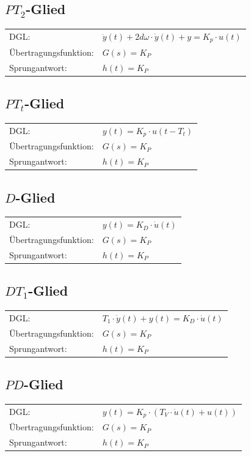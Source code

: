 \subsection{$PT_2$-Glied}
\begin{tabular}{ll}
\rule[-2ex]{0pt}{5.5ex} DGL: & $\ddot{y}(t) + 2d\omega\cdot \dot{y}(t)+y=K_p \cdot u(t)$ \\ 
\rule[-2ex]{0pt}{5.5ex} Übertragungsfunktion: & $G(s) = K_P$ \\ 
\rule[-2ex]{0pt}{5.5ex} Sprungantwort: & $h(t) = K_P$ \\ 
\end{tabular} 
\subsection{$PT_t$-Glied}
\begin{tabular}{ll}
\rule[-2ex]{0pt}{5.5ex} DGL: & $y(t) = K_p \cdot u(t-T_t)$ \\ 
\rule[-2ex]{0pt}{5.5ex} Übertragungsfunktion: & $G(s) = K_P$ \\ 
\rule[-2ex]{0pt}{5.5ex} Sprungantwort: & $h(t) = K_P$ \\ 
\end{tabular} 
\subsection{$D$-Glied}
\begin{tabular}{ll}
\rule[-2ex]{0pt}{5.5ex} DGL: & $y(t) = K_D \cdot \dot{u}(t)$ \\ 
\rule[-2ex]{0pt}{5.5ex} Übertragungsfunktion: & $G(s) = K_P$ \\ 
\rule[-2ex]{0pt}{5.5ex} Sprungantwort: & $h(t) = K_P$ \\ 
\end{tabular} 
\subsection{$DT_1$-Glied}
\begin{tabular}{ll}
\rule[-2ex]{0pt}{5.5ex} DGL: & $T_1 \cdot \dot{y}(t) + y(t) = K_D \cdot \dot{u}(t)$ \\ 
\rule[-2ex]{0pt}{5.5ex} Übertragungsfunktion: & $G(s) = K_P$ \\ 
\rule[-2ex]{0pt}{5.5ex} Sprungantwort: & $h(t) = K_P$ \\ 
\end{tabular} 
\subsection{$PD$-Glied}
\begin{tabular}{ll}
\rule[-2ex]{0pt}{5.5ex} DGL: & $y(t) = K_p \cdot \left(T_V \cdot \dot{u}(t) + u(t)\right)$ \\ 
\rule[-2ex]{0pt}{5.5ex} Übertragungsfunktion: & $G(s) = K_P$ \\ 
\rule[-2ex]{0pt}{5.5ex} Sprungantwort: & $h(t) = K_P$ \\ 
\end{tabular} 
